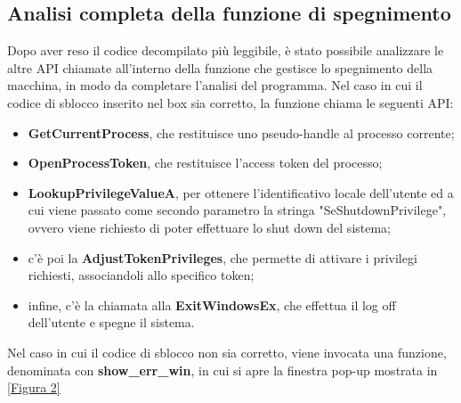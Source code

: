 \documentclass[12pt]{extarticle}
\begin{document}
\subsection{Analisi completa della funzione di spegnimento}
Dopo aver reso il codice decompilato più leggibile, è stato possibile analizzare le altre API chiamate all'interno della funzione che gestisce lo spegnimento della macchina, in modo da completare l'analisi del programma. Nel caso in cui il codice di sblocco inserito nel box sia corretto, la funzione chiama le seguenti API:
\begin{itemize}
\item \textbf{GetCurrentProcess}, che restituisce uno pseudo-handle al processo corrente;
\item \textbf{OpenProcessToken}, che restituisce l'access token del processo;
\item \textbf{LookupPrivilegeValueA}, per ottenere l'identificativo locale dell'utente ed a cui viene passato come secondo parametro la stringa "SeShutdownPrivilege", ovvero viene richiesto di poter effettuare lo shut down del sistema;
\item c'è  poi la \textbf{AdjustTokenPrivileges}, che permette di attivare i privilegi richiesti, associandoli allo specifico token;
\item infine, c'è la chiamata alla \textbf{ExitWindowsEx}, che effettua il log off dell'utente e spegne il sistema.
\end{itemize}
Nel caso in cui il codice di sblocco non sia corretto, viene invocata una funzione, denominata con \textbf{show\_err\_win}, in cui si apre la finestra pop-up mostrata in \ref{Figura 2}
\newpage
\end{document}
